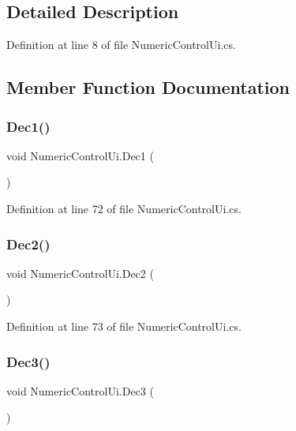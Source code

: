\subsection{Detailed Description}


Definition at line 8 of file Numeric\+Control\+Ui.\+cs.



\subsection{Member Function Documentation}
\mbox{\label{class_numeric_control_ui_a9c8c73af6395bdf852b9b0accceee765}} 
\subsubsection{\texorpdfstring{Dec1()}{Dec1()}}
{\footnotesize\ttfamily void Numeric\+Control\+Ui.\+Dec1 (\begin{DoxyParamCaption}{ }\end{DoxyParamCaption})}



Definition at line 72 of file Numeric\+Control\+Ui.\+cs.

\mbox{\label{class_numeric_control_ui_a57c1bbd7814a56164695ce2eaddc24df}} 
\subsubsection{\texorpdfstring{Dec2()}{Dec2()}}
{\footnotesize\ttfamily void Numeric\+Control\+Ui.\+Dec2 (\begin{DoxyParamCaption}{ }\end{DoxyParamCaption})}



Definition at line 73 of file Numeric\+Control\+Ui.\+cs.

\mbox{\label{class_numeric_control_ui_acc9c65621a2fe11e5a05ebc0b79fb3dd}} 
\subsubsection{\texorpdfstring{Dec3()}{Dec3()}}
{\footnotesize\ttfamily void Numeric\+Control\+Ui.\+Dec3 (\begin{DoxyParamCaption}{ }\end{DoxyParamCaption})}




